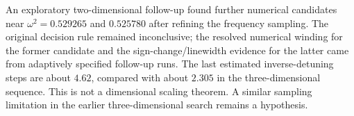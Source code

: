 An exploratory two-dimensional follow-up found further numerical
candidates near $\omega^2=0.529265$ and $0.525780$ after refining the
frequency sampling. The original decision rule remained inconclusive;
the resolved numerical winding for the former candidate and the
sign-change/linewidth evidence for the latter came from adaptively
specified follow-up runs. The last estimated inverse-detuning steps are
about $4.62$, compared with about $2.305$ in the three-dimensional sequence.
This is not a dimensional scaling theorem. A similar sampling limitation
in the earlier three-dimensional search remains a hypothesis.

